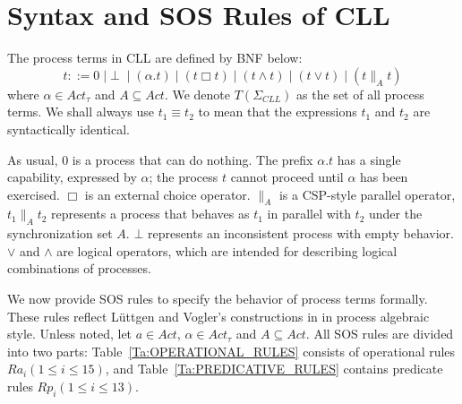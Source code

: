 \documentclass{elsarticle}
\theoremstyle{plain}
\theoremstyle{definition}
\begin{document}
\section{Syntax and SOS Rules of CLL}


The process terms in CLL are defined by BNF below:
\[ t::= 0\;|\perp\;|\;(\alpha.t) \;|\; (t\Box t)\;|\;(t\wedge t)\;|\;(t\vee t)\;|\;(t\parallel_A t) \] where $\alpha\in Act_\tau$ and  $A\subseteq Act $.
We denote $T(\Sigma_{CLL})$ as the set of all process terms. We shall always use $t_1 \equiv t_2$ to mean that the expressions $t_1$ and $t_2$ are syntactically identical.

As usual, 0 is a process that can do nothing.
The prefix $\alpha.t$ has a single capability, expressed by $\alpha$; the process $t$ cannot proceed until $\alpha$ has been exercised.
$\Box$ is an external choice operator.
$\parallel_A $ is a CSP-style parallel operator, $t_1\parallel_A t_2$ represents a process that behaves as $t_1$ in parallel with $t_2$ under the synchronization set $A$.
$\bot$ represents an inconsistent process with empty behavior.
$\vee$ and $\wedge$ are logical operators, which are intended for describing logical combinations of processes.

We now provide SOS rules to specify the behavior of process terms formally.
These rules reflect L\"{u}ttgen and Vogler's constructions in \cite{Luttgen10} in process algebraic style.
Unless noted, let $a \in Act$, $\alpha \in Act_{\tau}$ and $A \subseteq Act$.
All SOS rules are divided into two parts: Table~\ref{Ta:OPERATIONAL_RULES} consists of operational rules $Ra_i(1\leq i\leq 15)$, and Table~\ref{Ta:PREDICATIVE_RULES} contains predicate rules $Rp_i(1\leq i \leq 13)$.
\end{document}
